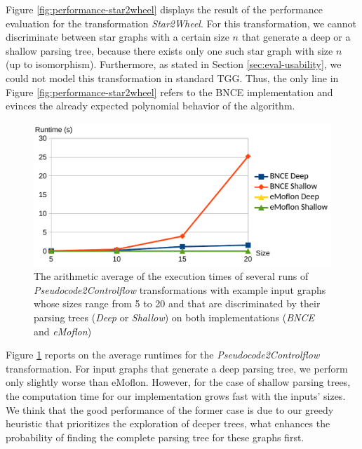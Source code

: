 Figure \ref{fig:performance-star2wheel} displays the result of the performance evaluation for the transformation \emph{Star2Wheel}. For this transformation, we cannot discriminate between star graphs with a certain size $n$ that generate a deep or a shallow parsing tree, because there exists only one such star graph with size $n$ (up to isomorphism). Furthermore, as stated in Section \ref{sec:eval-usability}, we could not model this transformation in standard TGG. Thus, the only line in Figure \ref{fig:performance-star2wheel} refers to the BNCE implementation and evinces the already expected polynomial behavior of the algorithm.

\begin{figure}
	\centering
	\includegraphics[width=.6\textwidth]{figures/performance/pseudocode2controlflow}
	\caption{The arithmetic average of the execution times of several runs of \emph{Pseudocode2Controlflow} transformations with example input graphs whose sizes range from 5 to 20 and that are discriminated by their parsing trees (\emph{Deep} or \emph{Shallow}) on both implementations (\emph{BNCE} and \emph{eMoflon})}
	\label{fig:performance-pseudocode2controlflow}
\end{figure}

Figure \ref{fig:performance-pseudocode2controlflow} reports on the average runtimes for the \emph{Pseudocode2Controlflow} transformation. For input graphs that generate a deep parsing tree, we perform only slightly worse than eMoflon. However, for the case of shallow parsing trees, the computation time for our implementation grows fast with the inputs' sizes. We think that the good performance of the former case is due to our greedy heuristic that prioritizes the exploration of deeper trees, what enhances the probability of finding the complete parsing tree for these graphs first.

